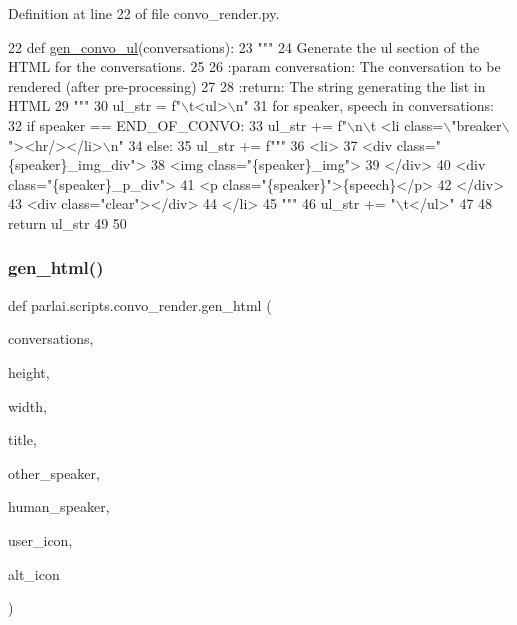 Definition at line 22 of file convo\+\_\+render.\+py.


\begin{DoxyCode}
22 \textcolor{keyword}{def }\hyperlink{namespaceparlai_1_1scripts_1_1convo__render_a8c393321c36d1cafceb86aa3f7431c4c}{gen\_convo\_ul}(conversations):
23     \textcolor{stringliteral}{"""}
24 \textcolor{stringliteral}{    Generate the ul section of the HTML for the conversations.}
25 \textcolor{stringliteral}{}
26 \textcolor{stringliteral}{    :param conversation: The conversation to be rendered (after pre-processing)}
27 \textcolor{stringliteral}{}
28 \textcolor{stringliteral}{    :return: The string generating the list in HTML}
29 \textcolor{stringliteral}{    """}
30     ul\_str = f\textcolor{stringliteral}{"\(\backslash\)t<ul>\(\backslash\)n"}
31     \textcolor{keywordflow}{for} speaker, speech \textcolor{keywordflow}{in} conversations:
32         \textcolor{keywordflow}{if} speaker == END\_OF\_CONVO:
33             ul\_str += f\textcolor{stringliteral}{"\(\backslash\)n\(\backslash\)t  <li class=\(\backslash\)"breaker\(\backslash\)"><hr/></li>\(\backslash\)n"}
34         \textcolor{keywordflow}{else}:
35             ul\_str += f\textcolor{stringliteral}{"""}
36 \textcolor{stringliteral}{    <li>}
37 \textcolor{stringliteral}{        <div class="\{speaker\}\_img\_div">}
38 \textcolor{stringliteral}{            <img class="\{speaker\}\_img">}
39 \textcolor{stringliteral}{        </div>}
40 \textcolor{stringliteral}{        <div class="\{speaker\}\_p\_div">}
41 \textcolor{stringliteral}{            <p class="\{speaker\}">\{speech\}</p>}
42 \textcolor{stringliteral}{        </div>}
43 \textcolor{stringliteral}{        <div class="clear"></div>}
44 \textcolor{stringliteral}{    </li>}
45 \textcolor{stringliteral}{    """}
46     ul\_str += \textcolor{stringliteral}{"\(\backslash\)t</ul>"}
47 
48     \textcolor{keywordflow}{return} ul\_str
49 
50 
\end{DoxyCode}
\mbox{\label{namespaceparlai_1_1scripts_1_1convo__render_ad23695f4d64e7dbd1fee801098d570b2}} 
\subsubsection{\texorpdfstring{gen\+\_\+html()}{gen\_html()}}
{\footnotesize\ttfamily def parlai.\+scripts.\+convo\+\_\+render.\+gen\+\_\+html (\begin{DoxyParamCaption}\item[{}]{conversations,  }\item[{}]{height,  }\item[{}]{width,  }\item[{}]{title,  }\item[{}]{other\+\_\+speaker,  }\item[{}]{human\+\_\+speaker,  }\item[{}]{user\+\_\+icon,  }\item[{}]{alt\+\_\+icon }\end{DoxyParamCaption})}

